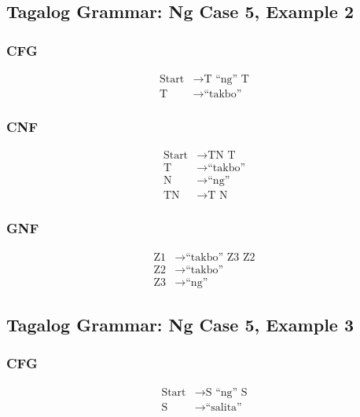 \newpage
\subsection{Tagalog Grammar: Ng Case 5, Example 2}
\subsubsection{CFG}
\begin{equation*}
    \begin{aligned}
        \text{Start}   & \rightarrow \text{T “ng” T}   \\
        \text{T} & \rightarrow \text{“takbo”}
    \end{aligned}
\end{equation*}

\subsubsection{CNF}
\begin{equation*}
    \begin{aligned}
        \text{Start}   & \rightarrow \text{TN T}   \\
        \text{T} & \rightarrow \text{“takbo”} \\
        \text{N} & \rightarrow \text{“ng”} \\
        \text{TN} & \rightarrow \text{T N}
    \end{aligned}
\end{equation*}

\subsubsection{GNF}
\begin{equation*}
    \begin{aligned}
        \text{Z1}   & \rightarrow \text{“takbo” Z3 Z2}   \\
        \text{Z2} & \rightarrow \text{“takbo”} \\
        \text{Z3} & \rightarrow \text{“ng”}
    \end{aligned}
\end{equation*}

\newpage
\subsection{Tagalog Grammar: Ng Case 5, Example 3}
\subsubsection{CFG}
\begin{equation*}
    \begin{aligned}
        \text{Start}   & \rightarrow \text{S “ng” S}   \\
        \text{S} & \rightarrow \text{“salita”}
    \end{aligned}
\end{equation*}

